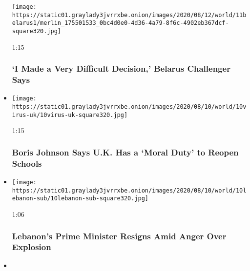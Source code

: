 \begin{itemize}
  \texttt{[image: https://static01.graylady3jvrrxbe.onion/images/2020/08/12/world/11belarus1/merlin\_175501533\_0bc4d0e0-4d36-4a79-8f6c-4902eb367dcf-square320.jpg]}

  1:15

  \hypertarget{i-made-a-very-difficult-decision-belarus-challenger-says}{%
  \subsubsection{`I Made a Very Difficult Decision,' Belarus Challenger
  Says}\label{i-made-a-very-difficult-decision-belarus-challenger-says}}
\item
  \href{https://www.nytimes3xbfgragh.onion/video/world/europe/100000007282371/boris-moral-duty-reopen-schools.html?action=click\&module=video-series-bar\&region=header\&pgtype=Article\&playlistId=video/world}{}

  \texttt{[image: https://static01.graylady3jvrrxbe.onion/images/2020/08/10/world/10virus-uk/10virus-uk-square320.jpg]}

  1:15

  \hypertarget{boris-johnson-says-uk-has-a-moral-duty-to-reopen-schools}{%
  \subsubsection{Boris Johnson Says U.K. Has a `Moral Duty' to Reopen
  Schools}\label{boris-johnson-says-uk-has-a-moral-duty-to-reopen-schools}}
\item
  \href{https://www.nytimes3xbfgragh.onion/video/us/politics/100000007282089/lebanon-prime-minister-resigns-explosion.html?action=click\&module=video-series-bar\&region=header\&pgtype=Article\&playlistId=video/world}{}

  \texttt{[image: https://static01.graylady3jvrrxbe.onion/images/2020/08/10/world/10lebanon-sub/10lebanon-sub-square320.jpg]}

  1:06

  \hypertarget{lebanons-prime-minister-resigns-amid-anger-over-explosion}{%
  \subsubsection{Lebanon's Prime Minister Resigns Amid Anger Over
  Explosion}\label{lebanons-prime-minister-resigns-amid-anger-over-explosion}}
\item
  \href{https://www.nytimes3xbfgragh.onion/video/us/100000007281530/hong-kong-arrests-jimmy-lai.html?action=click\&module=video-series-bar\&region=header\&pgtype=Article\&playlistId=video/world}{}


\end{itemize}
